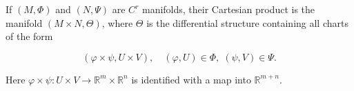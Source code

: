 If $(M, \Phi)$ and $(N, \Psi)$ are $C^r$ manifolds, their Cartesian product is the manifold $(M \times N, \Theta)$, where $\Theta$ is the differential structure containing all charts of the form

$$(\varphi \times \psi, U \times V), \quad (\varphi, U) \in \Phi, \; (\psi, V) \in \Psi.$$

Here $\varphi \times \psi: U \times V \to \mathbb{R}^m \times \mathbb{R}^n$ is identified with a map into $\mathbb{R}^{m+n}$.
